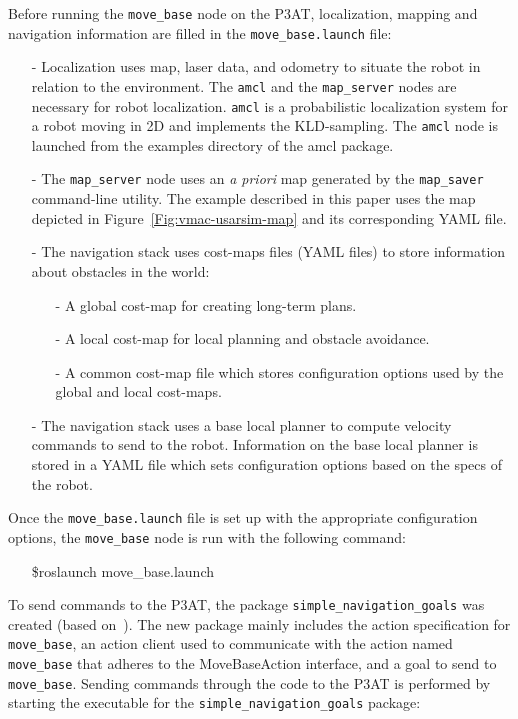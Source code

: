 Before running the \texttt{move\_base} node on the P3AT, localization, mapping and navigation information are filled in the \texttt{move\_base.launch} file:
\begin{itemize}
 \item [-] Localization uses map, laser data, and odometry to situate the robot in relation to the environment. The \texttt{amcl} and the \texttt{map\_server} nodes are necessary for robot localization. \texttt{amcl} is a probabilistic localization system for a robot moving in 2D and implements the KLD-sampling\cite{DIETER.IJRS.2003}. The \texttt{amcl} node is launched from the examples directory of the amcl package.
\item [-] The \texttt{map\_server} node uses an {\it a priori} map generated by the \texttt{map\_saver} command-line utility. The example described in this paper uses the map depicted in Figure~\ref{Fig:vmac-usarsim-map} and its corresponding YAML file.
\item [-] The navigation stack uses cost-maps files (YAML files) to store information about obstacles in the world:
\begin{itemize}
\item [-] A global cost-map for creating long-term plans.
\item [-] A local cost-map for local planning and obstacle avoidance.
\item [-] A common cost-map file which stores configuration options used by the global and local cost-maps.
\end{itemize}
\item [-] The navigation stack uses a base local planner to compute velocity commands to send to the robot. Information on the base local planner is stored in a YAML file which sets configuration options based on the specs of the robot.
\end{itemize}

Once the \texttt{move\_base.launch} file is set up with the appropriate configuration options, the \texttt{move\_base} node is run with the following command:

\begin{itemize}
\item[]\$roslaunch move\_base.launch
\end{itemize}

To send commands to the P3AT, the package \texttt{simple\_navigation\_goals} was created (based on~\cite{SendingSimpleGoals}). The new package mainly includes the action specification for \texttt{move\_base}, an action client used to communicate with the action named \texttt{move\_base} that adheres to the MoveBaseAction interface, and a goal to send to \texttt{move\_base}. Sending commands through the code to the P3AT is performed by starting the executable for the \texttt{simple\_navigation\_goals} package:

